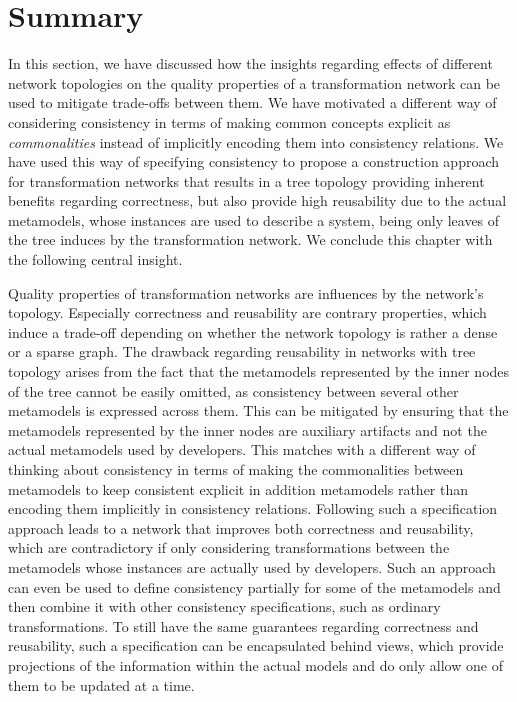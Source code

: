 \section{Summary}

In this section, we have discussed how the insights regarding effects of different network topologies on the quality properties of a transformation network can be used to mitigate trade-offs between them.
We have motivated a different way of considering consistency in terms of making common concepts explicit as \emph{commonalities} instead of implicitly encoding them into consistency relations.
We have used this way of specifying consistency to propose a construction approach for transformation networks that results in a tree topology providing inherent benefits regarding correctness, but also provide high reusability due to the actual metamodels, whose instances are used to describe a system, being only leaves of the tree induces by the transformation network.
We conclude this chapter with the following central insight.

\begin{insight}
    Quality properties of transformation networks are influences by the network's topology.
    Especially correctness and reusability are contrary properties, which induce a trade-off depending on whether the network topology is rather a dense or a sparse graph.
    The drawback regarding reusability in networks with tree topology arises from the fact that the metamodels represented by the inner nodes of the tree cannot be easily omitted, as consistency between several other metamodels is expressed across them.
    This can be mitigated by ensuring that the metamodels represented by the inner nodes are auxiliary artifacts and not the actual metamodels used by developers.
    This matches with a different way of thinking about consistency in terms of making the commonalities between metamodels to keep consistent explicit in addition metamodels rather than encoding them implicitly in consistency relations.
    Following such a specification approach leads to a network that improves both correctness and reusability, which are contradictory if only considering transformations between the metamodels whose instances are actually used by developers.
    Such an approach can even be used to define consistency partially for some of the metamodels and then combine it with other consistency specifications, such as ordinary transformations.
    To still have the same guarantees regarding correctness and reusability, such a specification can be encapsulated behind views, which provide projections of the information within the actual models and do only allow one of them to be updated at a time.
\end{insight}